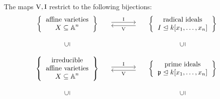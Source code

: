 \begin{theorem}
  The maps $\operatorname{V}, \operatorname{I}$ restrict to the following bijections:
  \[
    \begin{matrix}
        \left\{
          \begin{tabular}{c}
              affine varieties \\
              $X \subseteq \Aff^n$
          \end{tabular}
        \right\}
      & \begin{tikzcd}[column sep = large]
            {}
            \arrow[shift left]{r}{\Ideal}
          & {}
            \arrow[shift left]{l}{\Vset}
        \end{tikzcd}
      & \left\{
          \begin{tabular}{c}
            radical ideals \\
            $I \idealleq k[x_1, \dotsc, x_n]$
          \end{tabular}
        \right\}
      \\
        {}
      & {}
      & {}
      \\
        \rotatebox[origin=c]{90}{$\subseteq$}
      & {}
      & \rotatebox[origin=c]{90}{$\subseteq$}
      \\
        {}
      & {}
      & {}
      \\
        \left\{
          \begin{tabular}{c}
              irreducible \\
              affine varieties \\
              $X \subseteq \Aff^n$
          \end{tabular}
        \right\}
      & \begin{tikzcd}[column sep = large]
            {}
            \arrow[shift left]{r}{\Ideal}
          & {}
            \arrow[shift left]{l}{\Vset}
        \end{tikzcd}
      & \left\{
          \begin{tabular}{c}
            prime ideals \\
            $\mf{p} \idealleq k[x_1, \dotsc, x_n]$
          \end{tabular}
        \right\}
      \\
        {}
      & {}
      & {}
      \\
        \rotatebox[origin=c]{90}{$\subseteq$}
      & {}
      & \rotatebox[origin=c]{90}{$\subseteq$}
      \\
        {}
      & {}
      & {}

\end{matrix}\]
\end{theorem}
